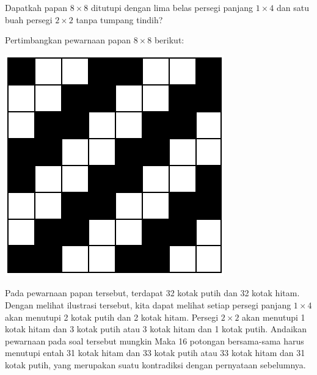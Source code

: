 \documentclass[11pt]{scrartcl}
\begin{document}
\begin{soaljawab}
    Dapatkah papan $8\times8$ ditutupi dengan lima belas persegi panjang $1\times4$ dan satu buah persegi $2\times2$ tanpa tumpang tindih?
    \begin{solusi}
        Pertimbangkan pewarnaan papan $8\times8$ berikut:
        \begin{center}
        \includegraphics[scale=0.5]{papancaturrev.PNG}
        \end{center}
        Pada pewarnaan papan tersebut, terdapat 32 kotak putih dan 32 kotak hitam. Dengan melihat ilustrasi tersebut, kita dapat melihat setiap persegi panjang $1\times4$ akan menutupi 2 kotak putih dan 2 kotak hitam. Persegi $2\times2$ akan menutupi 1 kotak hitam dan 3 kotak putih atau 3 kotak hitam dan 1 kotak putih. Andaikan pewarnaan pada soal tersebut mungkin Maka 16 potongan bersama-sama harus menutupi entah 31 kotak hitam dan 33 kotak putih atau 33 kotak hitam dan 31 kotak putih, yang merupakan suatu kontradiksi dengan pernyataan sebelumnya.
    \end{solusi}
\end{soaljawab}
\end{document}
